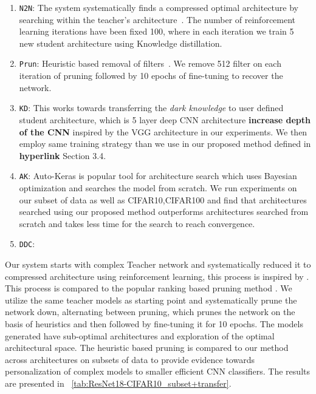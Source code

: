 \documentclass[../main]{subfiles}
\begin{document}
        \begin{enumerate}
            \item   \texttt{N2N}: The system systematically finds a compressed optimal architecture by searching within the teacher's architecture~\cite{ashok2017n2n}.
            The number of reinforcement learning iterations have been fixed 100, where in each iteration we train 5 new student architecture using Knowledge distillation.
            \item   \texttt{Prun}: Heuristic based removal of filters~\cite{molchanov2016pruning}.
            We remove 512 filter on each iteration of pruning followed by 10 epochs of fine-tuning to recover the network.
            \item   \texttt{KD}: \cite{hinton2015distilling} This works towards transferring the \textit{dark knowledge} to user defined student architecture, which is 5 layer deep CNN architecture \textbf{increase depth of the CNN} inspired by the VGG architecture \cite{simonyan2014very} in our experiments.
            We then employ same training strategy than we use in our proposed method defined in \textbf{hyperlink} Section 3.4. 
            \item   \texttt{AK}: Auto-Keras \cite{jin2018efficient} is popular tool for architecture search which uses Bayesian optimization and searches the model from scratch.
            We run experiments on our subset of data as well as CIFAR10,CIFAR100 and find that architectures searched using our proposed method outperforms architectures searched from scratch and takes less time for the search to reach convergence.
            
            \item   \texttt{DDC}: 
        \end{enumerate}
        
        Our system starts with complex Teacher network and systematically reduced it to compressed architecture using reinforcement learning, this process is inspired by \cite{ashok2017n2n}.
        This process is compared to the popular ranking based pruning method \cite{molchanov2016pruning}.
        We utilize the same teacher models as starting point and systematically prune the network down, alternating between pruning, which prunes the network on the basis of heuristics and then followed by fine-tuning it for 10 epochs.
        The models generated have sub-optimal architectures and exploration of the optimal architectural space.
        The heuristic based pruning is compared to our method across architectures on subsets of data to provide evidence towards personalization of complex models to smaller efficient CNN classifiers.
        The results are presented in \tablename~\ref{tab:ResNet18-CIFAR10_subset+transfer}.
    
\end{document}

